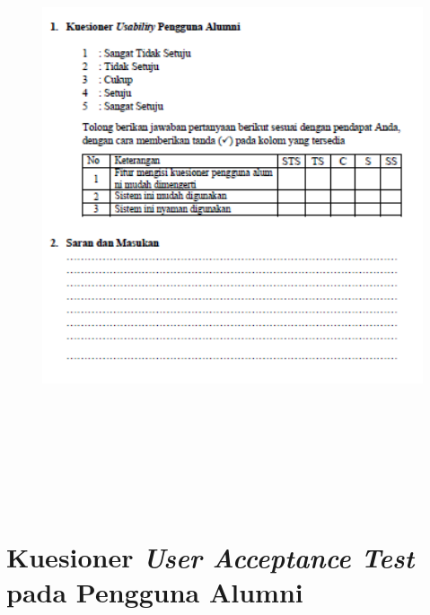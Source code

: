 \begin{figure}[H]
	\centering
	\includegraphics[width=15cm,height=18cm]{gambar/UAT/ku_pengguna}
	\label{ku_pengguna}
\end{figure}


\chapter{Kuesioner \textit{User Acceptance Test} pada Pengguna Alumni}